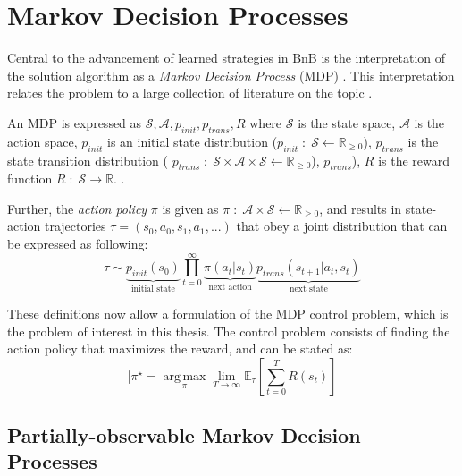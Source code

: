 \section{Markov Decision Processes}\label{sec:mdp}

Central to the advancement of learned strategies in \gls{BnB} is the interpretation of the solution algorithm as a \textit{Markov Decision Process} (\gls{MDP}) \cite{gasse2019exact}. This interpretation relates the problem to a large collection of literature on the topic \cite{howard1960dynamic}.

An \gls{MDP} is expressed as $ \mathcal{S}, \mathcal{A}, p_{init}, p_{trans}, R$ 
where $ \mathcal{S}$ is the state space, 
$\mathcal{A}$ is the action space, 
$p_{init}$ is an initial state distribution ($p_{init}\;:\;\mathcal{S}\leftarrow \mathbb{R}_{\geq 0}$), 
$p_{trans}$ is the state transition distribution (
$p_{trans}\; : \; \mathcal{S}
\times \mathcal{A}\times \mathcal{S}
\leftarrow \mathbb{R}_{\geq 0}$), 
$p_{trans}$), $R$ is the reward function $R\;:\;\mathcal{S} \rightarrow \mathbb{R}$. \cite{prouvost2020ecole}. 

Further, the \textit{action policy} $\pi$ is given as $\pi \; : \; \mathcal{A}\times \mathcal{S}
\leftarrow \mathbb{R}_{\geq 0}$, and results in state-action trajectories $\tau = (s_0, a_0, s_1, a_1, ... )$ that obey a joint distribution that can be expressed as following: \cite{prouvost2020ecole}
\begin{equation}
    \tau \sim \underbrace{p_\textit{init}(s_0)}_{\text{initial state}}
\prod_{t=0}^\infty \underbrace{\pi(a_t | s_t)}_{\text{next action}}
\underbrace{p_\textit{trans}(s_{t+1} | a_t, s_t)}_{\text{next state}}
\end{equation}

These definitions now allow a formulation of the \gls{MDP} control problem, which is the problem of interest in this thesis. The control problem consists of finding the action policy that maximizes the reward, and can be stated as: \cite{prouvost2020ecole}
\begin{equation}\label{eq:mdprcontrol}
    [\pi^\star = \underset{\pi}{\operatorname{arg\,max}}
\lim_{T \to \infty} \mathbb{E}_\tau\left[\sum_{t=0}^{T} R(s_t)\right]
\end{equation}


\subsection{Partially-observable Markov Decision Processes}

